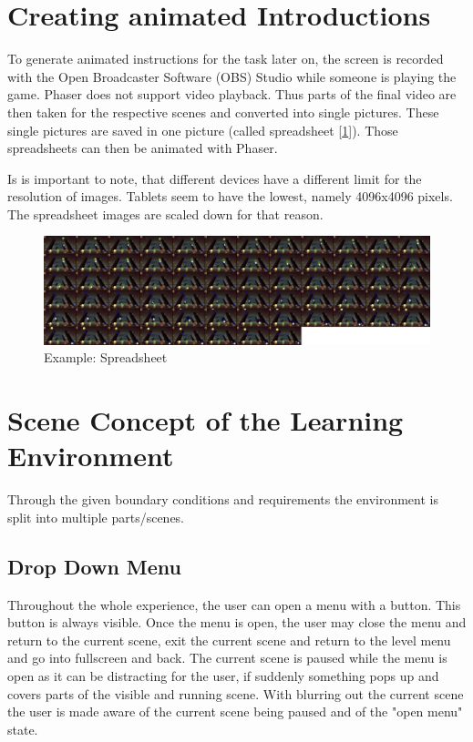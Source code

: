 \section{Creating animated Introductions}\label{sec:creating-animated-introductions}
To generate animated instructions for the task later on,
the screen is recorded with the Open Broadcaster Software (OBS) Studio\cite{obs} while someone is playing the game.
Phaser does not support video playback.
Thus parts of the final video are then taken for the respective scenes and converted into single pictures.
These single pictures are saved in one picture (called spreadsheet [\ref{fig:spreadsheet}]).
Those spreadsheets can then be animated with Phaser.

Is is important to note, that different devices have a different limit for the resolution of images.
Tablets seem to have the lowest, namely 4096x4096 pixels\cite{webglmaxtexturesize}.
The spreadsheet images are scaled down for that reason.

\begin{figure}[H]
    \centering
    \includegraphics[width=1\textwidth]{figures/spreadsheet}
    \caption{Example: Spreadsheet}
    \label{fig:spreadsheet}
\end{figure}

\section{Scene Concept of the Learning Environment}\label{sec:scene-concept-of-the-learning-environment}
Through the given boundary conditions and requirements the environment is split into multiple parts/scenes.

\subsection{Drop Down Menu}\label{subsec:drop-down-menu}
Throughout the whole experience, the user can open a menu with a button.
This button is always visible.
Once the menu is open, the user may close the menu and return to the current scene,
exit the current scene and return to the level menu and go into fullscreen and back.
The current scene is paused while the menu is open as it can be distracting for the user,
if suddenly something pops up and covers parts of the visible and running scene.
With blurring out the current scene the user is made aware of the current scene being paused and of the "open menu" state.

